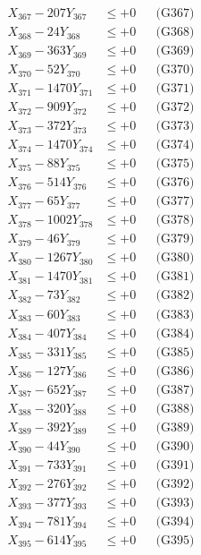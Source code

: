 \documentclass[a4paper,10pt]{article}
\begin{document}
{\begin{align}
X_{367} - 207Y_{367} &\leq +0 && \text{(G367)} \\
X_{368} - 24Y_{368} &\leq +0 && \text{(G368)} \\
X_{369} - 363Y_{369} &\leq +0 && \text{(G369)} \\
X_{370} - 52Y_{370} &\leq +0 && \text{(G370)} \\
\allowbreak
X_{371} - 1470Y_{371} &\leq +0 && \text{(G371)} \\
X_{372} - 909Y_{372} &\leq +0 && \text{(G372)} \\
X_{373} - 372Y_{373} &\leq +0 && \text{(G373)} \\
X_{374} - 1470Y_{374} &\leq +0 && \text{(G374)} \\
X_{375} - 88Y_{375} &\leq +0 && \text{(G375)} \\
X_{376} - 514Y_{376} &\leq +0 && \text{(G376)} \\
X_{377} - 65Y_{377} &\leq +0 && \text{(G377)} \\
X_{378} - 1002Y_{378} &\leq +0 && \text{(G378)} \\
X_{379} - 46Y_{379} &\leq +0 && \text{(G379)} \\
X_{380} - 1267Y_{380} &\leq +0 && \text{(G380)} \\
\allowbreak
X_{381} - 1470Y_{381} &\leq +0 && \text{(G381)} \\
X_{382} - 73Y_{382} &\leq +0 && \text{(G382)} \\
X_{383} - 60Y_{383} &\leq +0 && \text{(G383)} \\
X_{384} - 407Y_{384} &\leq +0 && \text{(G384)} \\
X_{385} - 331Y_{385} &\leq +0 && \text{(G385)} \\
X_{386} - 127Y_{386} &\leq +0 && \text{(G386)} \\
X_{387} - 652Y_{387} &\leq +0 && \text{(G387)} \\
X_{388} - 320Y_{388} &\leq +0 && \text{(G388)} \\
X_{389} - 392Y_{389} &\leq +0 && \text{(G389)} \\
X_{390} - 44Y_{390} &\leq +0 && \text{(G390)} \\
\allowbreak
X_{391} - 733Y_{391} &\leq +0 && \text{(G391)} \\
X_{392} - 276Y_{392} &\leq +0 && \text{(G392)} \\
X_{393} - 377Y_{393} &\leq +0 && \text{(G393)} \\
X_{394} - 781Y_{394} &\leq +0 && \text{(G394)} \\
X_{395} - 614Y_{395} &\leq +0 && \text{(G395)} \\

\end{align}}
\end{document}
